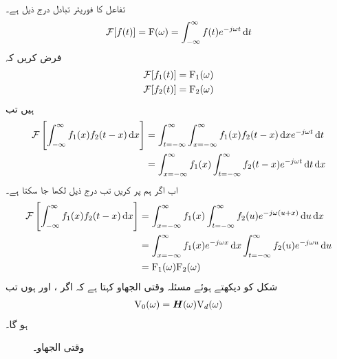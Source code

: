 تفاعل  کا فوریئر تبادل درج ذیل ہے۔
\begin{align}
\Fourier[f(t)]=\bF(\omega)=\int_{-\infty}^{\infty}f(t) e^{-j\omega t} \dif t
\end{align}
فرض کریں کہ 
\begin{align*}
\mathcal{F}[f_1(t)]&={{\textup{F}}}_1(\omega)\\
\mathcal{F}[f_2(t)]&={{\textup{F}}}_2(\omega)
\end{align*}
ہیں تب
\begin{align*}
\Fourier\left[\int_{-\infty}^{\infty}f_1(x)f_2(t-x)\dif x\right]&=\int_{t=-\infty}^{\infty}\int_{x=-\infty}^{\infty}f_1(x)f_2(t-x)\dif x  e^{-j\omega t}\dif t\\
&=\int_{x=-\infty}^{\infty}f_1(x)\int_{t=-\infty}^{\infty}f_2(t-x)  e^{-j\omega t}\dif t \dif x
\end{align*}
اب  اگر ہم  پر کریں  تب درج ذیل لکھا جا سکتا ہے۔
\begin{align*}
\Fourier\left[\int_{-\infty}^{\infty}f_1(x)f_2(t-x)\dif x\right]&=\int_{x=-\infty}^{\infty}f_1(x)\int_{t=-\infty}^{\infty}f_2(u)  e^{-j\omega (u+x)}\dif u \dif x\\
&=\int_{x=-\infty}^{\infty}f_1(x) e^{-j\omega x}\dif x \int_{t=-\infty}^{\infty}f_2(u)  e^{-j\omega u}\dif u \\
&=\bF_1(\omega) \bF_2(\omega)
\end{align*}
شکل  کو دیکھتے ہوئے مسئلہ وقتی الجھاو کہتا ہے کہ اگر ،
  اور  ہوں تب
\begin{align}\label{مساوات_فوریئر_حل_دور}
{\ensuremath{{\textup{V}}}}_0(\omega)={{\boldsymbol{H}}}(\omega) {{\textup{V}}}_d(\omega)
\end{align}
ہو گا۔
\begin{figure}
\centering
{}
\caption{وقتی الجھاو۔}
\label{شکل_فوریئر_وقتی_الجھاو}
\end{figure}
